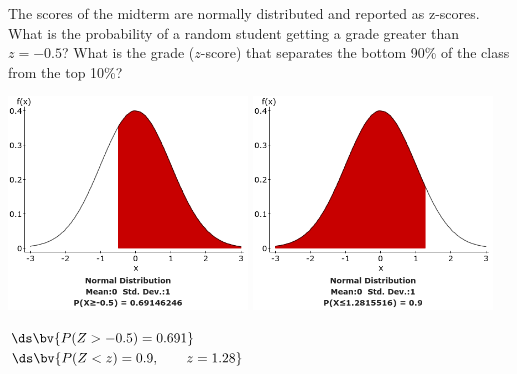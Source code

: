 \documentclass{article}
\begin{document}
\begin{flushleft}
\begin{enumalpha}
\item The scores of the midterm are normally distributed and reported as z-scores. What is the probability of a random student getting a grade greater than $z = -0.5$? What is the grade ($z$-score) that separates the bottom 90\% of the class from the top 10\%?\\
\medskip
{\centering
\includegraphics[width=2.5in]{images/grp06_Q1_b_1} \qquad
\includegraphics[width=2.5in]{images/grp06_Q1_b_2}
\par}
$\ds\bv{P(Z > -0.5) = 0.691}$\\
\medskip
$\ds\bv{P(Z < z) = 0.9, \qquad z = 1.28}$
\end{enumalpha}



\newpage

\end{flushleft}
\end{document}
